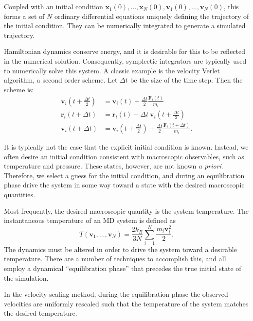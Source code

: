 \documentclass{article}
\begin{document}
Coupled with an initial condition $\mathbf{x}_1(0),\dots,\mathbf{x}_N(0),\mathbf{v}_1(0),\dots,\mathbf{v}_N(0)$, this forms a set of $N$ ordinary differential equations uniquely defining the trajectory of the initial condition. They can be numerically integrated to generate a simulated trajectory.

Hamiltonian dynamics conserve energy, and it is desirable for this to be reflected in the numerical solution. Consequently, symplectic integrators are typically used to numerically solve this system. A classic example is the velocity Verlet algorithm, a second order scheme. Let $\Delta t$ be the size of the time step. Then the scheme is:
\begin{equation}
\begin{split}
\mathbf{v}_i\left(t+\frac{\Delta t}{2}\right)  	&= \mathbf{v}_i(t) + \frac{\Delta t}{2}\frac{\mathbf{F}_i(t)}{m_i} \\
\mathbf{r}_i(t+\Delta t) 		   		&= \mathbf{r}_i(t) + \Delta t\:\mathbf{v}_i\left(t+\frac{\Delta t}{2}\right) \\
\mathbf{v}_i(t+\Delta t)			  	&= \mathbf{v}_i\left(t+\frac{\Delta t}{2}\right) + 
								\frac{\Delta t}{2}\frac{\mathbf{F}_i(t+\Delta t)}{m_i}.
\end{split}\label{verlet}
\end{equation}

It is typically not the case that the explicit initial condition is known. Instead, we often desire an initial condition consistent with macroscopic observables, such as temperature and pressure. These states, however, are not known \emph{a priori}. Therefore, we select a guess for the initial condition, and during an equilibration phase drive the system in some way toward a state with the desired macroscopic quantities.

Most frequently, the desired macroscopic quantity is the system temperature. The instantaneous temperature of an MD system is defined as
\begin{equation}
T(\mathbf{v}_1,\dots,\mathbf{v}_N)=\frac{2k_B}{3N}\sum_{i=1}^N\frac{m_i\mathbf{v}_i^2}{2}.
\end{equation}The dynamics must be altered in order to drive the system toward a desirable temperature. There are a number of techniques to accomplish this, and all employ a dynamical ``equilibration phase'' that precedes the true initial state of the simulation.

In the velocity scaling method, during the equilibration phase the observed velocities are uniformly rescaled such that the temperature of the system matches the desired temperature.
\end{document}

